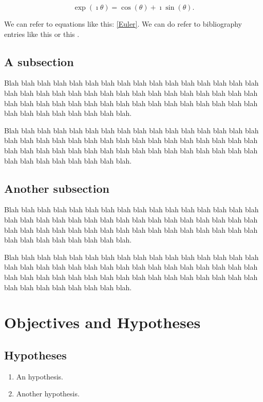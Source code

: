 \begin{equation}\label{Euler}
\exp(\imath\theta) = \cos(\theta) + \imath \sin(\theta).
\end{equation}

We can refer to equations like this: \eqref{Euler}.
We can do refer to bibliography entries like this \cite{AF:2003} or this \cite{CEL:arXiv, MS}.

\subsection{A subsection}

Blah blah blah blah blah blah blah blah blah blah blah blah blah blah blah blah blah blah blah blah blah blah blah blah blah blah blah blah blah blah blah blah blah blah blah blah blah blah blah blah blah blah blah blah blah blah blah blah blah blah blah blah blah blah blah blah.

Blah blah blah blah blah blah blah blah blah blah blah blah blah blah blah blah blah blah blah blah blah blah blah blah blah blah blah blah blah blah blah blah blah blah blah blah blah blah blah blah blah blah blah blah blah blah blah blah blah blah blah blah blah blah blah blah.

\subsection{Another subsection}

Blah blah blah blah blah blah blah blah blah blah blah blah blah blah blah blah blah blah blah blah blah blah blah blah blah blah blah blah blah blah blah blah blah blah blah blah blah blah blah blah blah blah blah blah blah blah blah blah blah blah blah blah blah blah blah blah.

Blah blah blah blah blah blah blah blah blah blah blah blah blah blah blah blah blah blah blah blah blah blah blah blah blah blah blah blah blah blah blah blah blah blah blah blah blah blah blah blah blah blah blah blah blah blah blah blah blah blah blah blah blah blah blah blah.

\section{Objectives and Hypotheses}

\subsection{Hypotheses}
\begin{enumerate}
\item An hypothesis.
\item Another hypothesis.
\end{enumerate}

